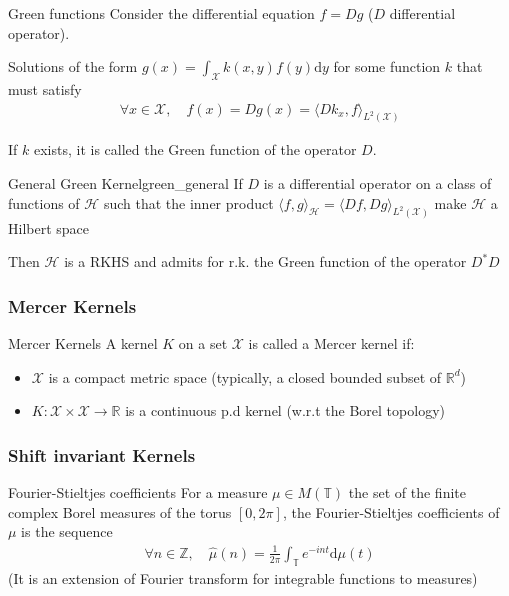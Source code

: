 \documentclass[10pt]{article}
\begin{document}
\begin{Definition}{Green functions}{}
  Consider the differential equation $f = Dg$ ($D$ differential operator).

  Solutions of the form $g(x) = \int_\mathcal{X} k(x,y)f(y) \text{d}y$ for some
  function $k$ that must satisfy 
  \begin{align*}
    \forall x \in \mathcal{X},\quad f(x)= Dg(x) = 
  \langle Dk_x, f\rangle_{L^2(\mathcal{X})}
  \end{align*}

  If $k$ exists, it is called the Green function of the operator $D$.
\end{Definition}

\begin{Theorem}{General Green Kernel}{green_general}
  If $D$ is a differential operator on a class of functions of $\mathcal{H}$
  such that the inner product $\langle f, g \rangle_\mathcal{H} = \langle Df, Dg 
  \rangle_{L^2(\mathcal{X})}$ make $\mathcal{H}$ a Hilbert space

  Then $\mathcal{H}$ is a RKHS and admits for r.k. the Green function of the 
  operator $D^*D$
\end{Theorem}


\subsubsection{Mercer Kernels}

\begin{Definition}{Mercer Kernels}{}
  A kernel $K$ on a set $\mathcal{X}$ is called a Mercer kernel if: 
  \begin{itemize}
    \item $\mathcal{X}$ is a compact metric space (typically, a closed bounded
    subset of $\mathbb{R}^d$)
    \item $K: \mathcal{X}\times\mathcal{X} \rightarrow \mathbb{R}$ is a
    continuous p.d kernel (w.r.t the Borel topology)
  \end{itemize}
\end{Definition}


\subsubsection{Shift invariant Kernels}
\begin{Definition}{Fourier-Stieltjes coefficients}{}
  For a measure $\mu \in M(\mathbb{T})$ the set of the finite complex Borel 
  measures of the torus $[0, 2\pi]$, the Fourier-Stieltjes coefficients of 
  $\mu$ is the sequence
  \begin{align*}
    \forall n \in \mathbb{Z}, \quad \hat{\mu}(n) = \frac{1}{2\pi}
    \int_\mathbb{T}e^{-int}\text{d}\mu(t)
  \end{align*}
  (It is an extension of Fourier transform for integrable functions to measures)
\end{Definition}
\end{document}
